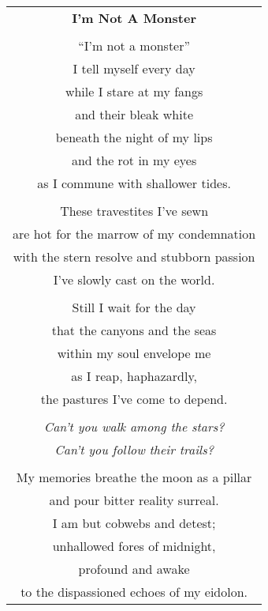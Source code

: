 \documentclass{article}
\begin{document}
\begin{center}
\begin{tabular}{c}
\textbf{I'm Not A Monster} \\
\\
``I'm not a monster'' \\
I tell myself every day \\
while I stare at my fangs \\
and their bleak white \\
beneath the night of my lips \\
and the rot in my eyes \\
as I commune with shallower tides. \\
\\
These travestites I've sewn \\
are hot for the marrow of my condemnation \\
with the stern resolve and stubborn passion \\
I've slowly cast on the world. \\
\\
Still I wait for the day \\
that the canyons and the seas \\
within my soul envelope me \\
as I reap, haphazardly, \\
the pastures I've come to depend. \\
\\
\textit{Can't you walk among the stars?} \\
\textit{Can't you follow their trails?} \\
\\
My memories breathe the moon as a pillar \\
and pour bitter reality surreal. \\
I am but cobwebs and detest; \\
unhallowed fores of midnight, \\
profound and awake \\
to the dispassioned echoes of my eidolon. \\
\end{tabular}
\end{center}
\end{document}
